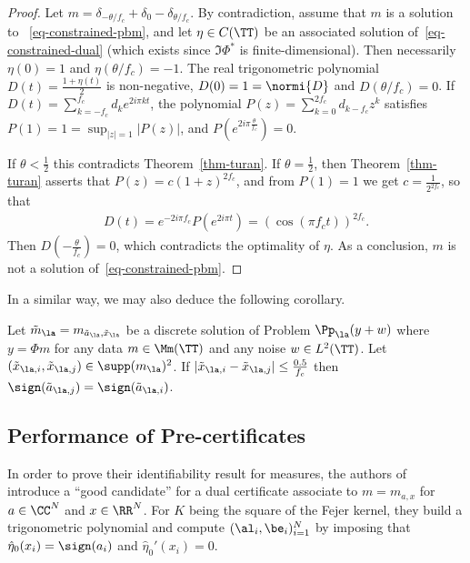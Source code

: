 \begin{proof}
Let $m=\delta_{-\theta/f_c}+\delta_{0} - \delta_{\theta/f_c}$. By contradiction, assume that $m$ is a solution to ~\eqref{eq-constrained-pbm},
 and let $\eta\in C(\TT)$ be an associated solution of~\eqref{eq-constrained-dual} (which
  exists since $\Im \Phi^*$ is finite-dimensional).
Then necessarily $\eta(0)=1$ and $\eta(\theta/f_c)=-1$.
The real trigonometric polynomial $D(t)=\frac{1+\eta(t)}{2}$ is non-negative,
 $D(0)=1=\normi{D}$ and $D(\theta/f_c)=0$. If $D(t)=\sum_{k=-f_c}^{f_c}d_k e^{2i\pi kt}$,
  the polynomial $P(z) = \sum_{k=0}^{2f_c}d_{k-f_c}z^k$ satisfies $P(1)=1=\sup_{|z|=1}|P(z)|$,
   and $P(e^{2i\pi\frac{\theta}{f_c}})=0$.
   
If $\theta<\frac{1}{2}$ this contradicts Theorem~\ref{thm-turan}. If $\theta=\frac{1}{2}$,
 then Theorem~\ref{thm-turan} asserts that $P(z)=c(1+z)^{2f_c}$, and from $P(1)=1$ we get $c=\frac{1}{2^{2f_c}}$,
 so that 
 \begin{align*}
 D(t)=e^{-2i\pi f_c}P(e^{2i\pi t})=\left(\cos (\pi f_c t)\right)^{2f_c}.
 \end{align*}
 Then $D(-\frac{\theta}{f_c})=0$, which contradicts the optimality of $\eta$.
As a conclusion, $m$ is not a solution of~\eqref{eq-constrained-pbm}. 
\end{proof}

In a similar way, we may also deduce the following corollary.

\begin{cor}
Let $\tilde{m}_\la=m_{\tilde{a}_\la,\tilde{x}_\la}$ be a discrete solution of Problem $\Pp_\la(y+w)$ where $y=\Phi m$ for any data $m\in \Mm(\TT)$ and any noise $w\in L^2(\TT)$. Let $(\tilde{x}_{\la,i}, \tilde{x}_{\la,j}) \in \supp (m_\la)^2$. If $|\tilde{x}_{\la,i}-\tilde{x}_{\la,j}|\leq \frac{0.5}{f_c}$
then $\sign (\tilde{a}_{\la,j})=\sign (\tilde{a}_{\la,i})$.
\end{cor}

\subsection{Performance of Pre-certificates}

In order to prove their identifiability result for measures, the authors of~\cite{Candes-toward} introduce a ``good candidate'' for a dual certificate associate to $m=m_{a,x}$ for $a \in \CC^N$ and $x \in \RR^N$. 
For $K$ being the square of the Fejer kernel, they build a trigonometric polynomial
and compute $(\al_i,\be_i)_{i=1}^N$ by imposing that $\hat \eta_0(x_i)=\sign (a_i)$ and $\hat \eta_0'(x_i)=0$.

